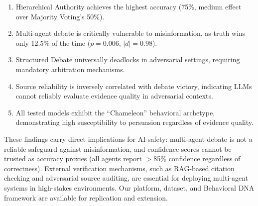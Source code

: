 \documentclass[11pt]{article}
\begin{document}
\begin{enumerate}[leftmargin=*, topsep=2pt, itemsep=2pt]
    \item Hierarchical Authority achieves the highest accuracy (75\%, medium effect over Majority Voting's 50\%).
    \item Multi-agent debate is critically vulnerable to misinformation, as truth wins only 12.5\% of the time ($p = 0.006$, $|d| = 0.98$).
    \item Structured Debate universally deadlocks in adversarial settings, requiring mandatory arbitration mechanisms.
    \item Source reliability is inversely correlated with debate victory, indicating LLMs cannot reliably evaluate evidence quality in adversarial contexts.
    \item All tested models exhibit the ``Chameleon'' behavioral archetype, demonstrating high susceptibility to persuasion regardless of evidence quality.
\end{enumerate}

These findings carry direct implications for AI safety: multi-agent debate is not a reliable safeguard against misinformation, and confidence scores cannot be trusted as accuracy proxies (all agents report $>$85\% confidence regardless of correctness). External verification mechanisms, such as RAG-based citation checking and adversarial source auditing, are essential for deploying multi-agent systems in high-stakes environments. Our platform, dataset, and Behavioral DNA framework are available for replication and extension.

\end{document}
